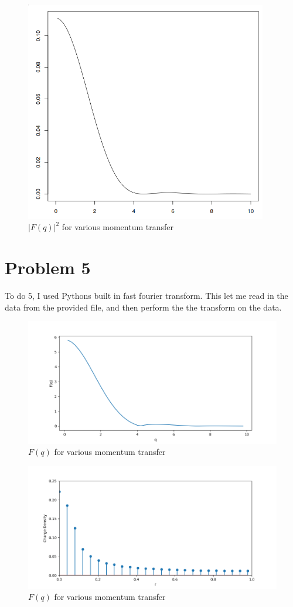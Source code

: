 \documentclass[12pt]{article}
\begin{document}
\begin{figure}[h]
  \centering
  \includegraphics[width=300pt]{p4_form_factor.png}
  \caption{$|F(q)|^2$ for various momentum transfer}
\end{figure}

\newpage
\section{Problem 5}

To do 5, I used Pythons built in fast fourier transform. This let me read in the data from the provided file, and then perform the the transform on the data.

\begin{figure}[h]
  \centering
  \includegraphics[width=400pt]{code/f_q.png}
  \caption{$F(q)$ for various momentum transfer}
\end{figure}

\begin{figure}[h]
  \centering
  \includegraphics[width=400pt]{code/rho_r.png}
  \caption{$F(q)$ for various momentum transfer}
\end{figure}
\end{document}
